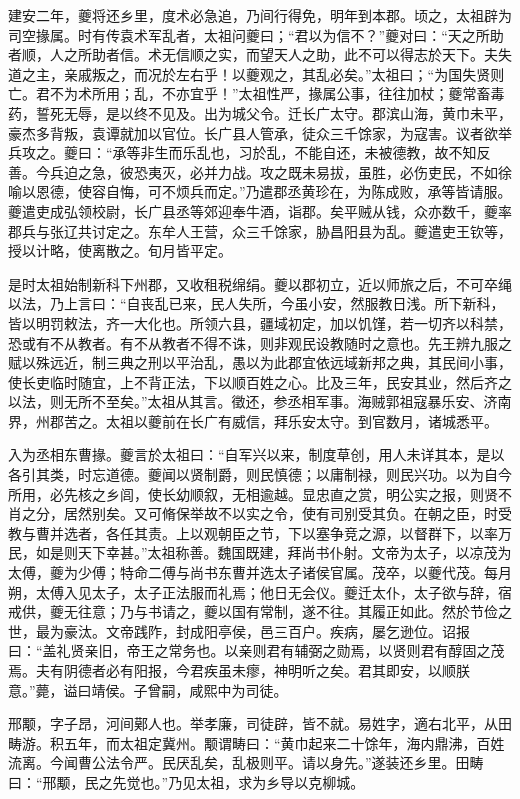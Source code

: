 \documentclass[12pt,UTF8]{ctexbook}
\begin{document}
建安二年，夔将还乡里，度术必急追，乃间行得免，明年到本郡。顷之，太祖辟为司空掾属。时有传袁术军乱者，太祖问夔曰；“君以为信不？”夔对曰：“天之所助者顺，人之所助者信。术无信顺之实，而望天人之助，此不可以得志於天下。夫失道之主，亲戚叛之，而况於左右乎！以夔观之，其乱必矣。”太祖曰；“为国失贤则亡。君不为术所用；乱，不亦宜乎！”太祖性严，掾属公事，往往加杖；夔常畜毒药，誓死无辱，是以终不见及。出为城父令。迁长广太守。郡滨山海，黄巾未平，豪杰多背叛，袁谭就加以官位。长广县人管承，徒众三千馀家，为寇害。议者欲举兵攻之。夔曰：“承等非生而乐乱也，习於乱，不能自还，未被德教，故不知反善。今兵迫之急，彼恐夷灭，必并力战。攻之既未易拔，虽胜，必伤吏民，不如徐喻以恩德，使容自悔，可不烦兵而定。”乃遣郡丞黄珍在，为陈成败，承等皆请服。夔遣吏成弘领校尉，长广县丞等郊迎奉牛酒，诣郡。矣平贼从钱，众亦数千，夔率郡兵与张辽共讨定之。东牟人王营，众三千馀家，胁昌阳县为乱。夔遣吏王钦等，授以计略，使离散之。旬月皆平定。

是时太祖始制新科下州郡，又收租税绵绢。夔以郡初立，近以师旅之后，不可卒绳以法，乃上言曰：“自丧乱已来，民人失所，今虽小安，然服教日浅。所下新科，皆以明罚敕法，齐一大化也。所领六县，疆域初定，加以饥馑，若一切齐以科禁，恐或有不从教者。有不从教者不得不诛，则非观民设教随时之意也。先王辨九服之赋以殊远近，制三典之刑以平治乱，愚以为此郡宜依远域新邦之典，其民间小事，使长吏临时随宜，上不背正法，下以顺百姓之心。比及三年，民安其业，然后齐之以法，则无所不至矣。”太祖从其言。徵还，参丞相军事。海贼郭祖寇暴乐安、济南界，州郡苦之。太祖以夔前在长广有威信，拜乐安太守。到官数月，诸城悉平。

入为丞相东曹掾。夔言於太祖曰：“自军兴以来，制度草创，用人未详其本，是以各引其类，时忘道德。夔闻以贤制爵，则民慎德；以庸制禄，则民兴功。以为自今所用，必先核之乡闾，使长幼顺叙，无相逾越。显忠直之赏，明公实之报，则贤不肖之分，居然别矣。又可脩保举故不以实之令，使有司别受其负。在朝之臣，时受教与曹并选者，各任其责。上以观朝臣之节，下以塞争竞之源，以督群下，以率万民，如是则天下幸甚。”太祖称善。魏国既建，拜尚书仆射。文帝为太子，以凉茂为太傅，夔为少傅；特命二傅与尚书东曹并选太子诸侯官属。茂卒，以夔代茂。每月朔，太傅入见太子，太子正法服而礼焉；他日无会仪。夔迁太仆，太子欲与辞，宿戒供，夔无往意；乃与书请之，夔以国有常制，遂不往。其履正如此。然於节俭之世，最为豪汰。文帝践阼，封成阳亭侯，邑三百户。疾病，屡乞逊位。诏报曰：“盖礼贤亲旧，帝王之常务也。以亲则君有辅弼之勋焉，以贤则君有醇固之茂焉。夫有阴德者必有阳报，今君疾虽未瘳，神明听之矣。君其即安，以顺朕意。”薨，谥曰靖侯。子曾嗣，咸熙中为司徒。

邢颙，字子昂，河间鄚人也。举孝廉，司徒辟，皆不就。易姓字，適右北平，从田畴游。积五年，而太祖定冀州。颙谓畴曰：“黄巾起来二十馀年，海内鼎沸，百姓流离。今闻曹公法令严。民厌乱矣，乱极则平。请以身先。”遂装还乡里。田畴曰：“邢颙，民之先觉也。”乃见太祖，求为乡导以克柳城。
\end{document}

